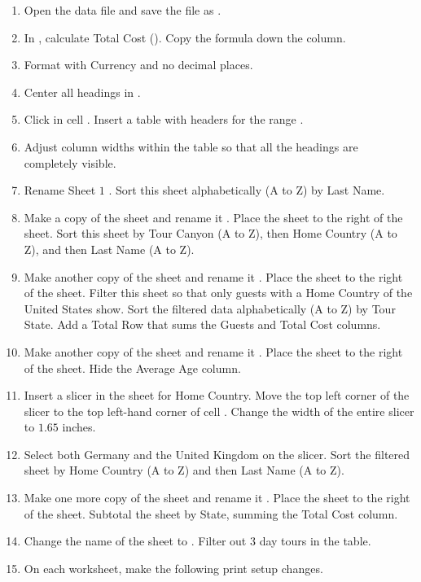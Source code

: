 \begin{enumerate}
	\item Open the data file  and save the file as .
	\item In , calculate Total Cost (). Copy the formula down the column.
	\item Format  with Currency and no decimal places.
	\item Center all headings in .
	\item Click in cell . Insert a table with headers for the range .
	\item Adjust column widths within the table so that all the headings are completely visible.
	\item Rename Sheet $ 1 $ . Sort this sheet alphabetically (A to Z) by Last Name.
	\item Make a copy of the  sheet and rename it . Place the  sheet to the right of the  sheet. Sort this sheet by Tour Canyon (A to Z), then Home Country (A to Z), and then Last Name (A to Z).
	\item Make another copy of the  sheet and rename it . Place the  sheet to the right of the  sheet. Filter this sheet so that only guests with a Home Country of the United States show. Sort the filtered data alphabetically (A to Z) by Tour State. Add a Total Row that sums the Guests and Total Cost columns.
	\item Make another copy of the  sheet and rename it . Place the  sheet to the right of the  sheet. Hide the Average Age column.
	\item Insert a slicer in the  sheet for Home Country. Move the top left corner of the slicer to the top left-hand corner of cell . Change the width of the entire slicer to $ 1.65 $ inches.
	\item Select both Germany and the United Kingdom on the slicer. Sort the filtered sheet by Home Country (A to Z) and then Last Name (A to Z).
	\item Make one more copy of the  sheet and rename it . Place the  sheet to the right of the  sheet. Subtotal the sheet by State, summing the Total Cost column.
	\item Change the name of the  sheet to  . Filter out $ 3 $ day tours in the table.
	\item On each worksheet, make the following print setup changes.


\end{enumerate}
